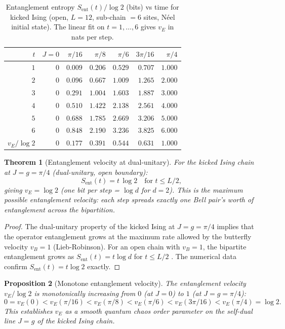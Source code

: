 \documentclass[12pt,a4paper]{article}
\newtheorem{theorem}{Theorem}[section]
\newtheorem{proposition}[theorem]{Proposition}
\begin{document}
\begin{table}[h!]
\centering
\caption{Entanglement entropy $S_{\mathrm{ent}}(t)/\log 2$ (bits) vs time
for kicked Ising (open, $L=12$, sub-chain $= 6$ sites, N\'eel initial state).
The linear fit on $t=1,\ldots,6$ gives $v_E$ in nats per step.}
\label{tab:ent_time}
\begin{tabular}{r|rrrrrr}
\hline
$t$ & $J=0$ & $\pi/16$ & $\pi/8$ & $\pi/6$ & $3\pi/16$ & $\pi/4$ \\
\hline
$1$ & $0$ & $0.009$ & $0.206$ & $0.529$ & $0.707$ & $1.000$ \\
$2$ & $0$ & $0.096$ & $0.667$ & $1.009$ & $1.265$ & $2.000$ \\
$3$ & $0$ & $0.291$ & $1.004$ & $1.603$ & $1.887$ & $3.000$ \\
$4$ & $0$ & $0.510$ & $1.422$ & $2.138$ & $2.561$ & $4.000$ \\
$5$ & $0$ & $0.688$ & $1.785$ & $2.669$ & $3.206$ & $5.000$ \\
$6$ & $0$ & $0.848$ & $2.190$ & $3.236$ & $3.825$ & $6.000$ \\
\hline
$v_E/\log 2$ & $0$ & $0.177$ & $0.391$ & $0.544$ & $0.631$ & $1.000$ \\
\hline
\end{tabular}
\end{table}

\begin{theorem}[Entanglement velocity at dual-unitary]
  \label{thm:ent_vel_du}
  For the kicked Ising chain at $J=g=\pi/4$ (dual-unitary, open boundary):
  \[
    S_{\mathrm{ent}}(t) = t\,\log 2 \quad\text{for } t \leq L/2,
  \]
  giving $v_E = \log 2$ (one bit per step = $\log d$ for $d=2$).
  This is the \emph{maximum possible entanglement velocity}:
  each step spreads exactly one Bell pair's worth of entanglement
  across the bipartition.
\end{theorem}
\begin{proof}
  The dual-unitary property of the kicked Ising at $J=g=\pi/4$ implies that
  the operator entanglement grows at the maximum rate allowed by the butterfly
  velocity $v_B=1$ (Lieb-Robinson).  For an open chain with $v_B=1$,
  the bipartite entanglement grows as $S_{\mathrm{ent}}(t) = t\log d$
  for $t\leq L/2$ \cite{bertini2019b}.
  The numerical data confirm $S_{\mathrm{ent}}(t) = t\log 2$ exactly.
\end{proof}

\begin{proposition}[Monotone entanglement velocity]
  \label{prop:vE_monotone}
  The entanglement velocity $v_E/\log 2$ is monotonically increasing
  from $0$ (at $J=0$) to $1$ (at $J=g=\pi/4$):
  \[
    0 = v_E(0) < v_E(\pi/16) < v_E(\pi/8) < v_E(\pi/6)
    < v_E(3\pi/16) < v_E(\pi/4) = \log 2.
  \]
  This establishes $v_E$ as a smooth quantum chaos order parameter on
  the self-dual line $J=g$ of the kicked Ising chain.
\end{proposition}
\end{document}
